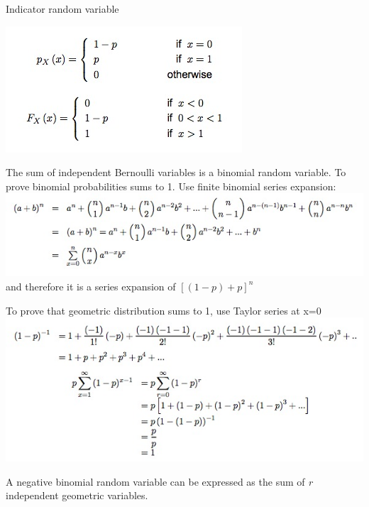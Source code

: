 \documentclass{examnotes}
\begin{document}
\disobeylines
Indicator random variable  %
\obeylines

\includegraphics[scale=0.6]{./img/2ber.jpg}


The sum of independent Bernoulli variables is a binomial random variable. 
To prove binomial probabilities sums to 1. Use finite binomial series expansion:
\includegraphics[scale=0.7]{./img/2ber2.jpg}
\vspace{-10pt}
and therefore it is a series expansion of $[(1-p)+p]^n$
\vspace{6pt}

To prove that geometric distribution sums to 1, use Taylor series at x=0
\includegraphics[scale=0.7]{./img/2geo.jpg}


A negative binomial random variable can be expressed as the sum of \emph{r} independent geometric variables.
\end{document}
